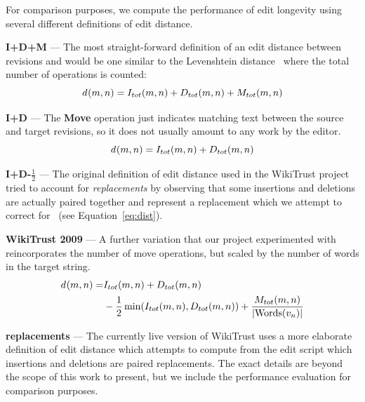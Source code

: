 For comparison purposes, we compute the performance of edit longevity
using several different definitions of edit distance.
\begin{description}
\item{\textbf{I+D+M}} --- The most straight-forward definition of an edit
	distance between revisions  and  would be one
	similar to the Levenshtein distance~\cite{Levenshtein1966} where
	the total number of operations is counted:
	\begin{equation}
	    \dist{}{m,n} = I_{tot}(m,n) + D_{tot}(m,n) + M_{tot}(m,n)
	\label{eq:dist-idm}
	\end{equation}
\item{\textbf{I+D}} --- The \textbf{Move} operation just indicates
	matching text between the source and target revisions,
	so it does not usually amount to any work by the editor.
	\begin{equation}
	    \dist{}{m,n} = I_{tot}(m,n) + D_{tot}(m,n)
	\label{eq:dist-id}
	\end{equation}
\item{\textbf{I+D-$\frac{1}{2}$}} --- The original definition of edit
	distance used in the WikiTrust project tried to account for
	\textit{replacements} by observing that some insertions and
	deletions are actually paired together and represent a
	replacement which we attempt to correct for~\cite{Adler2007}
	(see Equation~\ref{eq:dist}).
\item{\textbf{WikiTrust 2009}} --- A further variation that our
	project experimented with reincorporates the number of
	move operations, but scaled by the number of words in
	the target string.
	\begin{align}
	    d_{}(m,n) =& I_{tot}(m,n) + D_{tot}(m,n) \\
		& - \frac{1}{2}\min(I_{tot}(m,n), D_{tot}(m,n))
		+ \frac{M_{tot}(m,n)}{| \mathrm{Words}(v_{n}) |}
	\end{align}
\item{\textbf{replacements}} --- The currently live version of
	WikiTrust uses a more elaborate definition of edit distance
	which attempts to compute from the edit script
	which insertions and deletions
	are paired replacements.
	The exact details are beyond the scope of this work to present,
	but we include the performance evaluation for comparison purposes.
\end{description}


